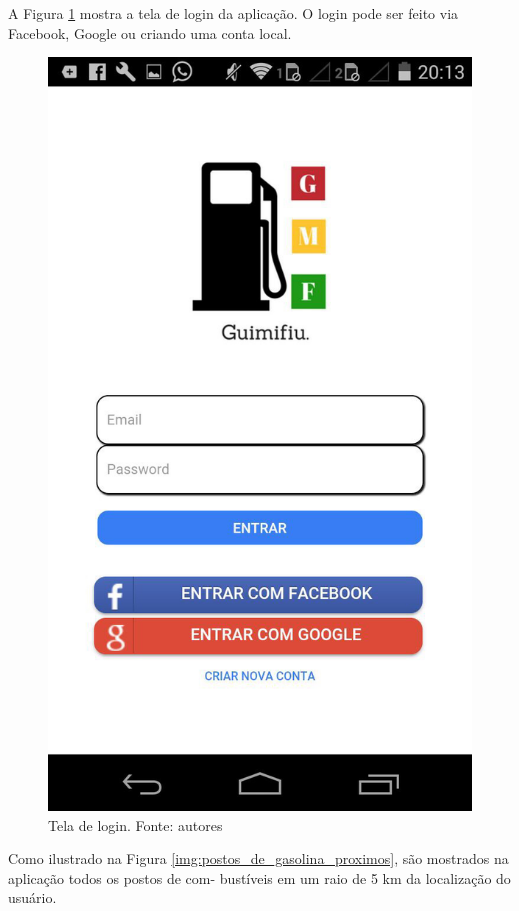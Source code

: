 A Figura \ref{img:tela_de_login} mostra a tela de login da aplicação. O login pode ser feito via Facebook, Google ou criando uma conta local.

\begin{figure}[H]
    \centering
    \includegraphics[scale=0.2]{figuras/app_1.jpg}
    \caption[Tela de login]{Tela de login. Fonte: autores}
    \label{img:tela_de_login}
\end{figure}
\pagebreak

Como ilustrado na Figura \ref{img:postos_de_gasolina_proximos}, são mostrados na aplicação todos os postos de com- bustíveis em um raio de 5 km da localização do usuário.

